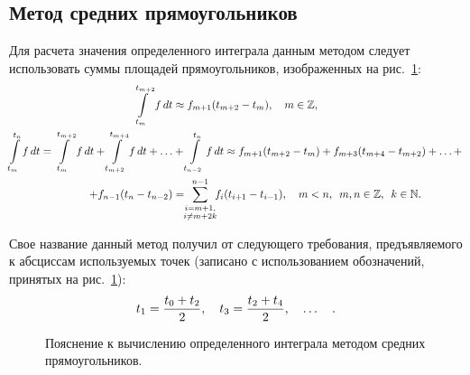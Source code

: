 \documentclass[12pt,a4paper,openany]{extarticle}
\begin{document}
\subsection{Метод средних прямоугольников}
\hspace*{\parindent}Для расчета значения определенного интеграла данным методом следует использовать суммы площадей прямоугольников, изображенных на рис.~\ref{fig:middle_rect_method}:
\begin{align}
\int\limits_{t_m}^{t_{m+2}} f\,dt &\approx f_{m+1}(t_{m+2}-t_m), \quad m\in\mathbb{Z},\\
\int\limits_{t_m}^{t_{n}} f\,dt = \int\limits_{t_m}^{t_{m+2}} f\,dt + \int\limits_{t_{m+2}}^{t_{m+4}} f\,dt + \ldots &+ \int\limits_{t_{n-2}}^{t_{n}} f\,dt \approx f_{m+1}(t_{m+2}-t_m) + f_{m+3}(t_{m+4}-t_{m+2}) + \ldots + \notag\\
+ f_{n-1}(t_{n}-t_{n-2}) &=\!\! \sum\limits_{\substack{i = m+1,\\i\ne m+2k}}^{n-1}\!\!f_i(t_{i+1}-t_{i-1}), \quad m<n, \;\: m,n\in\mathbb{Z}, \:\; k\in\mathbb{N}\ldotp
\end{align}

Свое название данный метод получил от следующего требования, предъявляемого к абсциссам используемых точек (записано с использованием обозначений, принятых на рис.~\ref{fig:middle_rect_method}):
\begin{equation}\label{eq:simm_requirement}
t_1 = \dfrac{t_0+t_2}{2}, \quad t_3 = \dfrac{t_2+t_4}{2}, \quad \ldots\quad\ldotp
\end{equation}

\begin{figure}[p]
	\caption{Пояснение к вычислению определенного интеграла методом средних прямоугольников.}
	\label{fig:middle_rect_method}
\end{figure}
\end{document}
